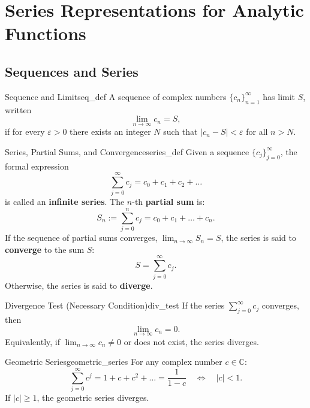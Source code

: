 \chapter{Series Representations for Analytic Functions}

\section{Sequences and Series}

\begin{definition}{Sequence and Limit}{seq_def}
A sequence of complex numbers $\{c_n\}_{n=1}^\infty$ has limit $S$, written
\begin{equation}
\lim_{n \to \infty} c_n = S,
\end{equation}
if for every $\varepsilon > 0$ there exists an integer $N$ such that $|c_n - S| < \varepsilon$ for all $n > N$.
\end{definition}

\begin{definition}{Series, Partial Sums, and Convergence}{series_def}
Given a sequence $\{c_j\}_{j=0}^\infty$, the formal expression
\begin{equation}
\sum_{j=0}^\infty c_j = c_0 + c_1 + c_2 + \dots
\end{equation}
is called an \textbf{infinite series}. The $n$-th \textbf{partial sum} is:
\begin{equation}
S_n := \sum_{j=0}^n c_j = c_0 + c_1 + \dots + c_n.
\end{equation}
If the sequence of partial sums converges, $\lim_{n \to \infty} S_n = S$, the series is said to \textbf{converge} to the sum $S$:
\begin{equation}
S = \sum_{j=0}^\infty c_j.
\end{equation}
Otherwise, the series is said to \textbf{diverge}.
\end{definition}

\begin{proposition}{Divergence Test (Necessary Condition)}{div_test}
If the series $\sum_{j=0}^\infty c_j$ converges, then
\begin{equation}
\lim_{n \to \infty} c_n = 0.
\end{equation}
Equivalently, if $\lim_{n \to \infty} c_n \neq 0$ or does not exist, the series diverges.
\end{proposition}

\begin{proposition}{Geometric Series}{geometric_series}
For any complex number $c \in \mathbb{C}$:
\begin{equation}
\sum_{j=0}^\infty c^j = 1 + c + c^2 + \dots = \frac{1}{1 - c} \quad \iff \quad |c| < 1.
\end{equation}
If $|c| \ge 1$, the geometric series diverges.
\end{proposition}

